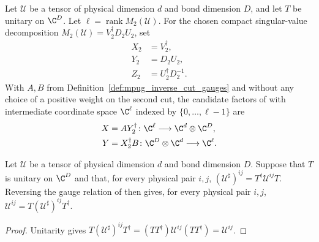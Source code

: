 \begin{definition}
    \label{def:mpug_inverse_cut_factors}
    \leanok
    Let $\mathcal U$ be a tensor of physical dimension $d$ and bond
    dimension $D$, and let $T$ be unitary on $\C^D$. Let
    $\ell=\operatorname{rank}M_2(\mathcal U)$. For the chosen compact
    singular-value decomposition $M_2(\mathcal U)=V_2^\dagger D_2U_2$, set
    \begin{align}
        X_2 & =V_2^\dagger,          \\
        Y_2 & =D_2U_2,               \\
        Z_2 & =U_2^\dagger D_2^{-1}.
    \end{align}
    With $A,B$ from Definition~\ref{def:mpug_inverse_cut_gauges} and without any
    choice of a positive weight on the second cut, the candidate factors of
    \cite[line~5432]{FrancoRubio2025MPUGauging} with intermediate coordinate
    space $\C^\ell$ indexed by $\{0,\ldots,\ell-1\}$ are
    \begin{align}
        X & =AY_2^\dagger\colon\C^\ell\longrightarrow\C^d\otimes\C^D,  \\
        Y & =X_2^\dagger B\colon\C^D\otimes\C^d\longrightarrow\C^\ell.
    \end{align}
\end{definition}

\begin{lemma}
    \label{thm:mpug_inverse_cut_reverse_gauge}
    \leanok
    Let $\mathcal U$ be a tensor of physical dimension $d$ and bond
    dimension $D$. Suppose that $T$ is unitary on $\C^D$ and that, for
    every physical pair $i,j$,
    $(\mathcal U^\sharp)^{ij}=T^\dagger\mathcal U^{ij}T$. Reversing the gauge
    relation of \cite[lines~5391--5410]{FrancoRubio2025MPUGauging} then gives,
    for every physical pair $i,j$,
    $\mathcal U^{ij}=T(\mathcal U^\sharp)^{ij}T^\dagger$.
\end{lemma}
\begin{proof}\leanok
    Unitarity gives
    $T(\mathcal U^\sharp)^{ij}T^\dagger
        =(TT^\dagger)\mathcal U^{ij}(TT^\dagger)=\mathcal U^{ij}$.
\end{proof}

